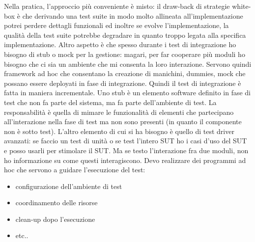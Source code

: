 \documentclass{article}
\begin{document}
Nella pratica, l'approccio più conveniente è misto: il draw-back di strategie white-box è che derivando una test suite in modo molto allineata all'implementazione potrei perdere dettagli funzionali ed inoltre se evolve l'implementazione, la qualità della test suite potrebbe degradare in quanto troppo legata alla specifica implementazione. Altro aspetto è che spesso durante i test di integrazione ho bisogno di stub o mock per la gestione: magari, per far cooperare più moduli ho bisogno che ci sia un ambiente che mi consenta la loro interazione. Servono quindi framework ad hoc che consentano la creazione di manichini, dummies, mock che possano essere deployati in fase di integrazione. Quindi il test di integrazione è fatta in maniera incrementale. Uno stub è un elemento software definito in fase di test che non fa parte del sistema, ma fa parte dell'ambiente di test. La responsabilità è quella di mimare le funzionalità di elementi che partecipano  all'interazione nella fase di test ma non sono presenti (in quanto il componente non è sotto test). L'altro elemento di cui si ha bisogno è quello di test driver avanzati: se faccio un test di unità o se test l'intero SUT ho i casi d'uso del SUT e posso usarli per stimolare il SUT. Ma se testo l'interazione fra due moduli, non ho informazione su come questi interagiscono. Devo realizzare dei programmi ad hoc che servono a guidare l'esecuzione del test:
\begin{itemize}
\item configurazione dell'ambiente di test
\item coordinamento delle risorse
\item clean-up dopo l'esecuzione
\item etc..
\end{itemize}
\end{document}

